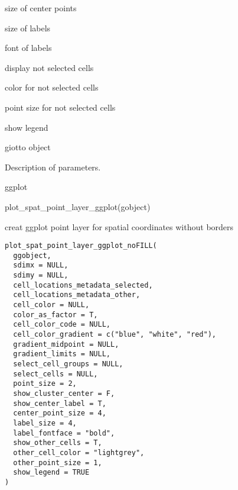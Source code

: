 \documentclass[a4paper]{book}
\begin{document}
\begin{Arguments}
\begin{ldescription}
\item[\code{center\_point\_size}] size of center points

\item[\code{label\_size}] size of labels

\item[\code{label\_fontface}] font of labels

\item[\code{show\_other\_cells}] display not selected cells

\item[\code{other\_cell\_color}] color for not selected cells

\item[\code{other\_point\_size}] point size for not selected cells

\item[\code{show\_legend}] show legend

\item[\code{gobject}] giotto object
\end{ldescription}
\end{Arguments}
%
\begin{Details}\relax
Description of parameters.
\end{Details}
%
\begin{Value}
ggplot
\end{Value}
%
\begin{Examples}
\begin{ExampleCode}
    plot_spat_point_layer_ggplot(gobject)
\end{ExampleCode}
\end{Examples}
%
\begin{Description}\relax
creat ggplot point layer for spatial coordinates without borders
\end{Description}
%
\begin{Usage}
\begin{verbatim}
plot_spat_point_layer_ggplot_noFILL(
  ggobject,
  sdimx = NULL,
  sdimy = NULL,
  cell_locations_metadata_selected,
  cell_locations_metadata_other,
  cell_color = NULL,
  color_as_factor = T,
  cell_color_code = NULL,
  cell_color_gradient = c("blue", "white", "red"),
  gradient_midpoint = NULL,
  gradient_limits = NULL,
  select_cell_groups = NULL,
  select_cells = NULL,
  point_size = 2,
  show_cluster_center = F,
  show_center_label = T,
  center_point_size = 4,
  label_size = 4,
  label_fontface = "bold",
  show_other_cells = T,
  other_cell_color = "lightgrey",
  other_point_size = 1,
  show_legend = TRUE
)
\end{verbatim}
\end{Usage}
\end{document}
